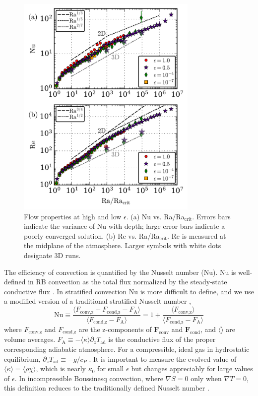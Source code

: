 \documentclass[aps, prl, twocolumn, nofootinbib, groupedaddress, amsfonts, amssymb, amsmath]{revtex4-1}
\newcommand{\grad}{\ensuremath{\nabla}}
\begin{document}
\begin{figure}[t]
\includegraphics[width=3.4375in]{./figs/re_and_nu_v_Ra.png}
\caption{
Flow properties at high and low $\epsilon$. 
(a) Nu vs. Ra/Ra$_{\text{crit}}$.
Errors bars indicate the variance of Nu with depth;
large error bars indicate a poorly converged solution.
(b) Re vs. Ra/Ra$_{\text{crit}}$.
Re is measured at the midplane of the atmosphere.
Larger symbols with white dots designate 3D runs.
 \label{fig:re_and_nu_v_ra}
}
\end{figure}

The efficiency of convection is quantified by the Nusselt number (Nu).  
Nu is well-defined in RB convection
as the total flux normalized by the steady-state conductive flux 
\cite{johnston&doering2009, otero&all2002}.
In stratified convection Nu is more difficult to define, and we use
a modified version of a traditional stratified Nusselt number 
\cite{graham1975,hurlburt&all1984},
\begin{equation}
\text{Nu} \equiv \frac{\langle F_{\text{conv,z}} + F_{\text{cond,z}} - F_{\text{A}}\rangle}
{\langle F_{\text{cond,z}} - F_{\text{A}}\rangle} 
= 1 + \frac{\langle F_{\text{conv,z}}\rangle}{\langle F_{\text{cond,z}} - F_{\text{A}} \rangle}
\label{eqn:nusselt}
\end{equation}
where $F_{\text{conv,z}}$ and $F_{\text{cond,z}}$ are the 
z-components of $\bm{F}_{\text{conv}}$ and $\bm{F}_{\text{cond}}$,
and $\langle \rangle$ are volume averages.  
$F_{\text{A}} \equiv -\langle\kappa\rangle \partial_z T_{\text{ad}}$ 
is the conductive flux of the proper corresponding adiabatic atmosphere.
For a compressible, ideal gas in hydrostatic equilibrium,
$\partial_z T_{\text{ad}} \equiv - g / c_{P}$ \cite{spiegel&veronis1960}.  
It is important to measure the evolved value of
$\langle \kappa \rangle = \langle \rho\chi \rangle$, which is nearly
$\kappa_0$ for small $\epsilon$ but changes appreciably for large
values of $\epsilon$.
In incompressible Boussinesq convection, where $\grad S = 0$ only when 
$\grad T = 0$, this definition reduces to the traditionally defined
Nusselt number \cite{otero&all2002, johnston&doering2009}.
\end{document}
